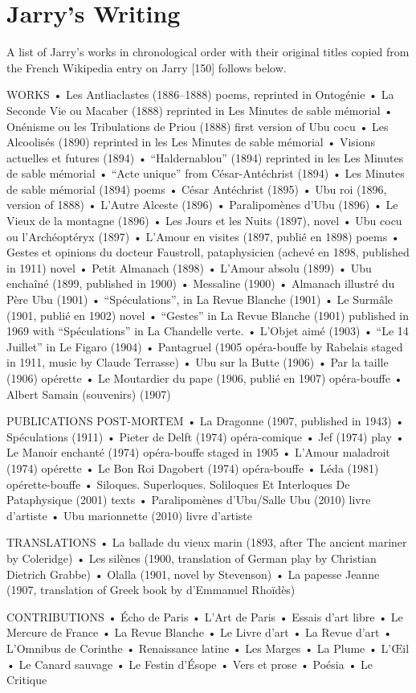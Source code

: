 
\chapter{Jarry's Writing}
\label{app:jarry}

A list of Jarry’s works in chronological order with their original titles copied from the French Wikipedia entry on Jarry [150] follows below.

WORKS
•	Les Antliaclastes (1886--1888) poems, reprinted in Ontogénie
•	La Seconde Vie ou Macaber (1888) reprinted in Les Minutes de sable mémorial
•	Onénisme ou les Tribulations de Priou (1888) first version of Ubu cocu
•	Les Alcoolisés (1890) reprinted in les Les Minutes de sable mémorial
•	Visions actuelles et futures (1894)
•	``Haldernablou'' (1894) reprinted in les Les Minutes de sable mémorial
•	``Acte unique'' from César-Antéchrist (1894)
•	Les Minutes de sable mémorial (1894) poems
•	César Antéchrist (1895)
•	Ubu roi (1896, version of 1888)
•	L’Autre Alceste (1896)
•	Paralipomènes d’Ubu (1896)
•	Le Vieux de la montagne (1896)
•	Les Jours et les Nuits (1897), novel
•	Ubu cocu ou l'Archéoptéryx (1897)
•	L’Amour en visites (1897, publié en 1898) poems
•	Gestes et opinions du docteur Faustroll, pataphysicien (achevé en 1898, published in 1911) novel
•	Petit Almanach (1898)
•	L’Amour absolu (1899)
•	Ubu enchaîné (1899, published in 1900)
•	Messaline (1900)
•	Almanach illustré du Père Ubu (1901)
•	``Spéculations'', in La Revue Blanche (1901)
•	Le Surmâle (1901, publié en 1902) novel
•	``Gestes'' in La Revue Blanche (1901) published in 1969 with ``Spéculations'' in  La Chandelle verte.
•	L’Objet aimé (1903)
•	``Le 14 Juillet'' in Le Figaro (1904)
•	Pantagruel (1905 opéra-bouffe by Rabelais staged in 1911, music by Claude Terrasse)
•	Ubu sur la Butte (1906)
•	Par la taille (1906) opérette
•	Le Moutardier du pape (1906, publié en 1907) opéra-bouffe
•	Albert Samain (souvenirs) (1907)

PUBLICATIONS POST-MORTEM
•	La Dragonne (1907, published in 1943)
•	Spéculations (1911)
•	Pieter de Delft (1974) opéra-comique
•	Jef (1974) play
•	Le Manoir enchanté (1974) opéra-bouffe staged in 1905
•	L’Amour maladroit (1974) opérette
•	Le Bon Roi Dagobert (1974) opéra-bouffe
•	Léda (1981) opérette-bouffe
•	Siloques. Superloques. Soliloques Et Interloques De Pataphysique (2001) texts
•	Paralipomènes d'Ubu/Salle Ubu (2010) livre d'artiste
•	Ubu marionnette (2010) livre d'artiste

TRANSLATIONS
•	La ballade du vieux marin (1893, after The ancient mariner by Coleridge)
•	Les silènes (1900, translation of German play by Christian Dietrich Grabbe)
•	Olalla (1901, novel by Stevenson)
•	La papesse Jeanne (1907, translation of Greek book by d’Emmanuel Rhoïdès)

CONTRIBUTIONS
•	Écho de Paris
•	L’Art de Paris
•	Essais d’art libre
•	Le Mercure de France
•	La Revue Blanche
•	Le Livre d’art
•	La Revue d’art
•	L’Omnibus de Corinthe
•	Renaissance latine
•	Les Marges
•	La Plume
•	L'Œil
•	Le Canard sauvage
•	Le Festin d'Ésope
•	Vers et prose
•	Poésia
•	Le Critique

